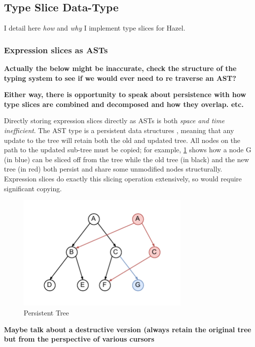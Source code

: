 \subsection{Type Slice Data-Type}\label{sec:TypeSliceDataType}
I detail here \textit{how} and \textit{why} I implement type slices for Hazel.

\subsubsection{Expression slices as ASTs}
\textbf{Actually the below might be inaccurate, check the structure of the typing system to see if we would ever need to re traverse an AST?}

\textbf{Either way, there is opportunity to speak about persistence with how type slices are combined and decomposed and how they overlap. etc.}

Directly storing expression slices directly as ASTs is both \textit{space and time inefficient}. The AST type is a persistent data structures \cite[ch. 2]{PurelyFunctionalDataStructures}, meaning that any update to the tree will retain both the old and updated tree. All nodes on the path to the updated sub-tree must be copied; for example, \cref{fig:PersistentTrees} shows how a node G (in blue) can be sliced off from the tree while the old tree (in black) and the new tree (in red) both persist and share some unmodified nodes structurally. Expression slices do exactly this slicing operation extensively, so would require significant copying.
\begin{figure}[h]
\center\includegraphics[width=0.75\textwidth]{Media/Figures/persistenttree}
\caption{Persistent Tree}
\label{fig:PersistentTrees}
\end{figure}

\textbf{Maybe talk about a destructive version (always retain the original tree but from the perspective of various cursors}

